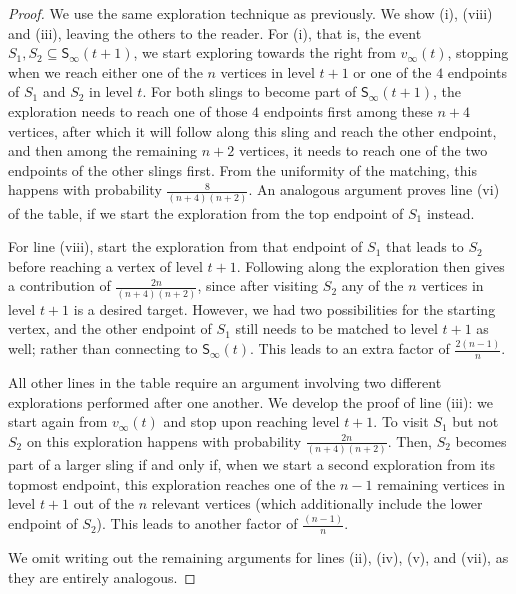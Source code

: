 \documentclass[a4paper,11pt,reqno]{amsart}
\newcommand{\paul}[1]{\todo[color=yellow!70,inline]{Paul: #1}}
\newcommand{\fabian}[1]{\todo[color=red!50,inline]{Fabian: #1}}
\newcommand{\Soo}{\mathsf{S}_\infty}
\newcommand{\ssq}{\subseteq}
\theoremstyle{definition}
\begin{document}
\begin{proof}
 We use the same exploration technique as previously. We show (i), (viii) and (iii), leaving the others to the reader. For (i), that is, the event $S_1,S_2 \ssq \Soo(t+1)$, we start exploring towards the right from $v_\infty(t)$, stopping when we reach either one of the $n$ vertices in level $t+1$ or one of the $4$ endpoints of $S_1$ and $S_2$ in level $t$. For both slings to become part of $\Soo(t+1)$, the exploration needs to reach one of those $4$ endpoints first among these $n+4$ vertices, after which it will follow along this sling and reach the other endpoint, and then among the remaining $n+2$ vertices, it needs to reach one of the two endpoints of the other slings first. From the uniformity of the matching, this happens with probability $\frac{8}{(n+4)(n+2)}$.
 An analogous argument proves line (vi) of the table, if we start the exploration from the top endpoint of $S_1$ instead. 
 
 For line (viii), start the exploration from that endpoint of $S_1$ that leads to $S_2$ before reaching a vertex of level $t+1$. 
 Following along the exploration then gives a contribution of $\frac{2n}{(n+4)(n+2)}$, since after visiting $S_2$ any of the $n$ vertices in level $t+1$ is a desired target. However, we had two possibilities for the starting vertex, and the other endpoint of $S_1$ still needs to be matched to level $t+1$ as well; rather than connecting to $\Soo(t)$. This leads to an extra factor of $\frac{2(n-1)}{n}$. 
 
 All other lines in the table require an argument involving two different explorations performed after one another. We develop the proof of line (iii): we start again from $v_\infty(t)$ and stop upon reaching level $t+1$. To visit $S_1$ but not $S_2$ on this exploration happens with probability $\frac{2n}{(n+4)(n+2)}$. Then, $S_2$ becomes part of a larger sling if and only if, when we start a second exploration from its topmost endpoint, this exploration reaches one of the $n-1$ remaining vertices in level $t+1$ out of the $n$ relevant vertices (which additionally include the lower endpoint of $S_2$). This leads to another factor of $\frac{(n-1)}{n}$. 
 
 We omit writing out the remaining arguments for lines (ii), (iv), (v), and (vii), as they are entirely analogous. 
\end{proof}
\end{document}
